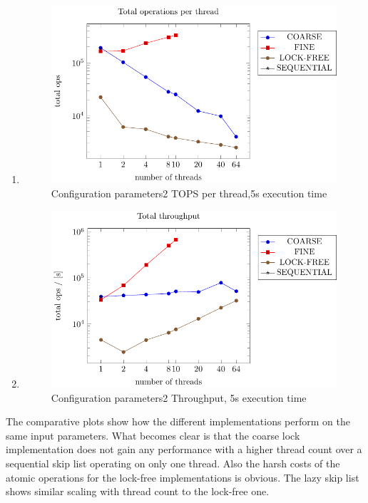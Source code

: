 \documentclass{article}
\begin{document}
\begin{enumerate}
    \item
    \begin{figure}[H]
        \centering
        \includegraphics{../plots/parameters2_5s_per_thread.pdf}
        \caption{Configuration parameters2 TOPS per thread,5s execution time}
       
        \label{fig:parameters2_5s_per_thread}
    \end{figure}


    \item
    \begin{figure}[H]
        \centering
        \includegraphics{../plots/parameters2_5s_throughput.pdf}
        \caption{Configuration parameters2 Throughput, 5s execution time}
        \label{fig:arameters2_5s_throughput}
    \end{figure}


    
\end{enumerate}

The comparative plots show how the different implementations perform on the same input parameters. 
What becomes clear is that the coarse lock implementation does not gain any performance with a higher thread count over a sequential skip list operating on only one thread. 
Also the harsh costs of the atomic operations for the lock-free implementations is obvious. The lazy skip list shows similar scaling with thread count to the lock-free one.
\end{document}
